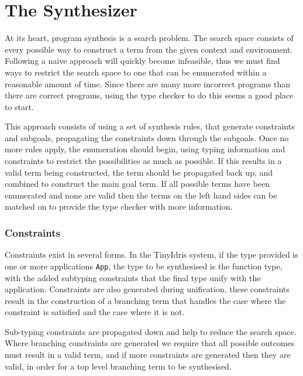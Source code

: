 \documentclass[a4paper]{article}
\begin{document}
\section{The Synthesizer}
\label{sec:org8cc6487}
At its heart, program synthesis is a search problem. The search space consists of every possible way to
construct a term from the given context and environment. Following a naive approach will quickly become infeasible, 
thus we must find ways to restrict the search space to one that can be enumerated within a reasonable amount of time. Since there are 
many more incorrect programs than there are correct programs, using the type checker to do this seems a good place 
to start. 

This approach consists of using a set of synthesis rules, that generate constraints 
and subgoals, propagating the constraints down through the subgoals. Once no more rules apply, the enumeration should begin, using 
typing information and constraints to restrict the possibilities as much as possible. If this results in a valid term being constructed, the term should be 
propagated back up, and combined to construct the main goal term. If all possible terms have been enumerated and none are valid then 
the terms on the left hand sides can be matched on to provide the type checker with more information. 

\subsubsection{Constraints}
\label{sec:org730db40}
Constraints exist in several forms. In the TinyIdris system, if the type provided is one or more  
applications \texttt{App}, the type to be synthesised is the function type, with the added subtyping constraints that the final type unify with
the application. Constraints are also generated during unification, these constraints result in the construction of a 
branching term that handles the case where the constraint is satisfied and the case where it is not. 

Sub-typing constraints are propagated down and help to reduce the search space. Where branching constraints are 
generated we require that all possible outcomes must result in a valid term, and if more constraints are generated
then they are valid, in order for a top level branching term to be synthesised.
\end{document}
